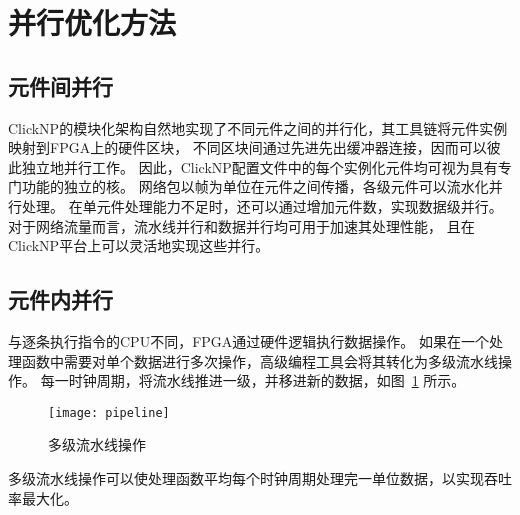 \section{并行优化方法}
\subsection{元件间并行}
ClickNP的模块化架构自然地实现了不同元件之间的并行化，其工具链将元件实例映射到FPGA上的硬件区块，
不同区块间通过先进先出缓冲器连接，因而可以彼此独立地并行工作。
因此，ClickNP配置文件中的每个实例化元件均可视为具有专门功能的独立的核。
网络包以帧为单位在元件之间传播，各级元件可以流水化并行处理。
在单元件处理能力不足时，还可以通过增加元件数，实现数据级并行。
对于网络流量而言，流水线并行和数据并行均可用于加速其处理性能，
且在ClickNP平台上可以灵活地实现这些并行。

\subsection{元件内并行}
与逐条执行指令的CPU不同，FPGA通过硬件逻辑执行数据操作。
如果在一个处理函数中需要对单个数据进行多次操作，高级编程工具会将其转化为多级流水线操作。
每一时钟周期，将流水线推进一级，并移进新的数据，如图~\ref{fig:pipeline} 所示。

\begin{figure}[htbp]
\centering
\texttt{[image: pipeline]}
\caption{多级流水线操作} \label{fig:pipeline}
\end{figure}

多级流水线操作可以使处理函数平均每个时钟周期处理完一单位数据，以实现吞吐率最大化。
